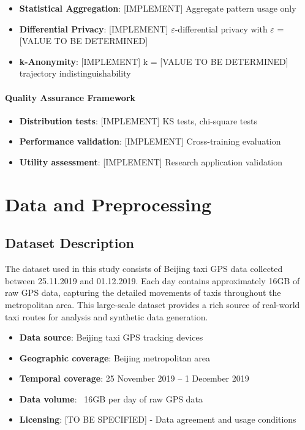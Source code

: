 \documentclass[runningheads]{llncs}
\begin{document}
\begin{itemize}
\item \textbf{Statistical Aggregation}: [IMPLEMENT] Aggregate pattern usage only
\item \textbf{Differential Privacy}: [IMPLEMENT] $\varepsilon$-differential privacy with $\varepsilon$ = [VALUE TO BE DETERMINED]
\item \textbf{k-Anonymity}: [IMPLEMENT] k = [VALUE TO BE DETERMINED] trajectory indistinguishability
\end{itemize}

\paragraph{Quality Assurance Framework}

\begin{itemize}
\item \textbf{Distribution tests}: [IMPLEMENT] KS tests, chi-square tests
\item \textbf{Performance validation}: [IMPLEMENT] Cross-training evaluation
\item \textbf{Utility assessment}: [IMPLEMENT] Research application validation
\end{itemize}


\section{Data and Preprocessing}
\label{sec:data-preprocessing}


\subsection{Dataset Description}
\label{sec:data}

The dataset used in this study consists of Beijing taxi GPS data collected between 25.11.2019 and 01.12.2019. Each day contains approximately 16GB of raw GPS data, capturing the detailed movements of taxis throughout the metropolitan area. This large-scale dataset provides a rich source of real-world taxi routes for analysis and synthetic data generation.

\begin{itemize}
\item \textbf{Data source}: Beijing taxi GPS tracking devices
\item \textbf{Geographic coverage}: Beijing metropolitan area
\item \textbf{Temporal coverage}: 25 November 2019 -- 1 December 2019
\item \textbf{Data volume}: ~16GB per day of raw GPS data
\item \textbf{Licensing}: [TO BE SPECIFIED] - Data agreement and usage conditions
\end{itemize}
\end{document}
